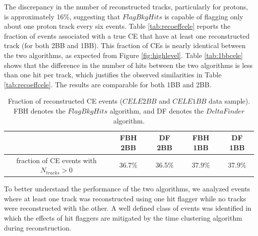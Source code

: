 The discrepancy in the number of reconstructed tracks, particularly 
for protons, is approximately 16\%, suggesting that $FlagBkgHits$ is 
capable of flagging only about one proton track every six events. 
Table \ref{tab:recoeffcele} reports the fraction of events associated 
with a true CE that have at least one reconstructed track (for both 2BB and 1BB). 
This fraction of CEs is nearly identical between the two algorithms, 
as expected from Figure \ref{fig:highlevel}. Table \ref{tab:1bbcele} shows 
that the difference in the number of hits between the two algorithms 
is less than one hit per track, which justifies the observed similarities in 
Table \ref{tab:recoeffcele}. The results are comparable for both 1BB and 2BB.



\begin{center}
    \begin{table}[h!]
    \centering
    \renewcommand{\arraystretch}{1.}
    \begin{tabular}{| c | c | c | c | c |} 
    \hline
    & FBH 2BB & DF 2BB & FBH 1BB & DF 1BB  \\
    \hline
    fraction of CE events with $N_{tracks}>0$ & 36.7\% & 36.5\% & 37.9\% & 37.9\%\\
    \hline
    \end{tabular}
    \caption[Fraction of reconstructed CE events.]{Fraction of reconstructed CE events ($CELE2BB$ and $CELE1BB$ data sample). FBH denotes 
    the $FlagBkgHits$ algorithm, and DF denotes the $DeltaFinder$ algorithm.}
    \end{table}\label{tab:recoeffcele}
\end{center}

To better understand the performance of the two algorithms, 
we analyzed events where at least one track was reconstructed 
using one hit flagger while no tracks were reconstructed 
with the other. A well defined class of events was identified in 
which the effects of hit flaggers are mitigated by the time 
clustering algorithm during reconstruction.

